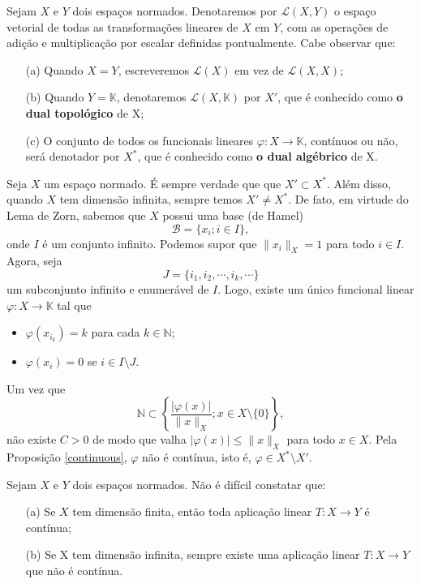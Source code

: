 \begin{definition}
    Sejam $X$ e $Y$ dois espaços normados. Denotaremos por $\mathcal L (X,Y)$ o espaço vetorial de todas as transformações lineares de $X$ em $Y$, com as operações de adição e multiplicação por escalar definidas pontualmente. Cabe observar que:
    \begin{itemize}
    \item[(a)] Quando $X=Y$, escreveremos $\mathcal L (X)$ em vez de $\mathcal L (X,X)$;
    \item[(b)] Quando $Y=\mathbb K$, denotaremos $\mathcal L (X,\mathbb K)$ por $X'$, que é conhecido como \textbf{o dual topológico} de X;
    \item[(c)] O conjunto de todos os funcionais lineares $\varphi : X\longrightarrow \mathbb K$, contínuos ou não, será denotador por $X^{\ast}$, que é conhecido como \textbf{o dual algébrico} de X.
    \end{itemize}
\end{definition}

\begin{remark}
Seja $X$ um espaço normado. É sempre verdade que que $X' \subset X^{\ast}$. Além disso, quando $X$ tem dimensão infinita, sempre temos $X'\neq X^{\ast}$. De fato, em virtude do Lema de Zorn, sabemos que $X$ possui uma base (de Hamel)
\[
\displaystyle \mathcal B = \{ x_i; i\in I\},
\]
onde $I$ é um conjunto infinito. Podemos supor que $\| x_i \|_X =1$ para todo $i\in I$. Agora, seja 
\[
\displaystyle J = \{ i_1, i_2, \cdots , i_k, \cdots \}
\]
um subconjunto infinito e enumerável de $I$. Logo, existe um único funcional linear $\varphi : X \longrightarrow \mathbb K$ tal que 
\begin{itemize}
\item $\varphi (x_{i_k})=k$ para cada $k\in \mathbb N$;
\item $\varphi (x_i)=0$ se $i\in I\setminus J$.
\end{itemize}
Um vez que 
\[
\displaystyle \mathbb N \subset \left\{ \frac{|\varphi (x)|}{\|x\|_{X}}; x\in X\setminus \{0\}\right\},
\]
não existe $C>0$ de modo que valha $|\varphi (x)|\leq \|x\|_X$ para todo $x\in X$. Pela Proposição \ref{continuous}, $\varphi$ não é contínua, isto é, $\varphi \in X^{\ast} \setminus X'$.
\end{remark}

\begin{remark}
Sejam $X$ e $Y$ dois espaços normados. Não é difícil constatar que:
\begin{itemize}
\item[(a)] Se $X$ tem dimensão finita, então toda aplicação linear $T:X\longrightarrow Y$ é contínua;
\item[(b)] Se X tem dimensão infinita, sempre existe uma aplicação linear $T:X\longrightarrow Y$ que não é contínua.
\end{itemize}
\end{remark}

